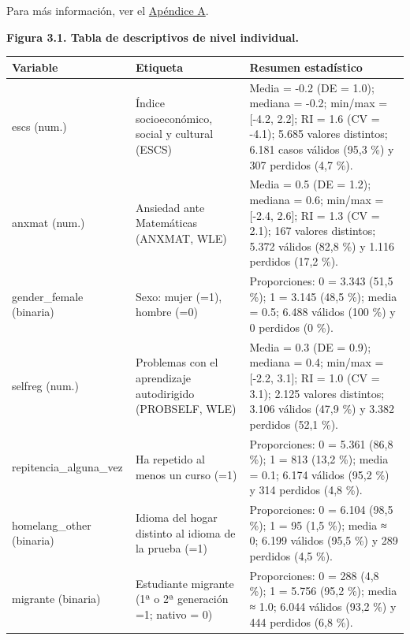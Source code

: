 \documentclass[
  spanish,
  a4paper,
  oneside]{scrbook}
\begin{document}
Para más información, ver el \hyperref[sec-anexo-a]{Apéndice A}.

\begingroup
\footnotesize

\textbf{Figura 3.1. Tabla de descriptivos de nivel individual.}

\begin{longtable}[]{@{}
  >{\raggedright\arraybackslash}p{}
  >{\raggedright\arraybackslash}p{}
  >{\raggedright\arraybackslash}p{}@{}}
\toprule\noalign{}
\begin{minipage}[b]{\linewidth}\raggedright
Variable
\end{minipage} & \begin{minipage}[b]{\linewidth}\raggedright
Etiqueta
\end{minipage} & \begin{minipage}[b]{\linewidth}\raggedright
Resumen estadístico
\end{minipage} \\
\midrule\noalign{}
\endhead
\bottomrule\noalign{}
\endlastfoot
escs (num.) & Índice socioeconómico, social y cultural (ESCS) & Media =
-0.2 (DE = 1.0); mediana = -0.2; min/max = {[}-4.2, 2.2{]}; RI = 1.6 (CV
= -4.1); 5.685 valores distintos; 6.181 casos válidos (95,3 \%) y 307
perdidos (4,7 \%). \\
anxmat (num.) & Ansiedad ante Matemáticas (ANXMAT, WLE) & Media = 0.5
(DE = 1.2); mediana = 0.6; min/max = {[}-2.4, 2.6{]}; RI = 1.3 (CV =
2.1); 167 valores distintos; 5.372 válidos (82,8 \%) y 1.116 perdidos
(17,2 \%). \\
gender\_female (binaria) & Sexo: mujer (=1), hombre (=0) & Proporciones:
0 = 3.343 (51,5 \%); 1 = 3.145 (48,5 \%); media = 0.5; 6.488 válidos
(100 \%) y 0 perdidos (0 \%). \\
selfreg (num.) & Problemas con el aprendizaje autodirigido (PROBSELF,
WLE) & Media = 0.3 (DE = 0.9); mediana = 0.4; min/max = {[}-2.2, 3.1{]};
RI = 1.0 (CV = 3.1); 2.125 valores distintos; 3.106 válidos (47,9 \%) y
3.382 perdidos (52,1 \%). \\
repitencia\_alguna\_vez & Ha repetido al menos un curso (=1) &
Proporciones: 0 = 5.361 (86,8 \%); 1 = 813 (13,2 \%); media = 0.1; 6.174
válidos (95,2 \%) y 314 perdidos (4,8 \%). \\
homelang\_other (binaria) & Idioma del hogar distinto al idioma de la
prueba (=1) & Proporciones: 0 = 6.104 (98,5 \%); 1 = 95 (1,5 \%); media
≈ 0; 6.199 válidos (95,5 \%) y 289 perdidos (4,5 \%). \\
migrante (binaria) & Estudiante migrante (1ª o 2ª generación =1; nativo
= 0) & Proporciones: 0 = 288 (4,8 \%); 1 = 5.756 (95,2 \%); media ≈ 1.0;
6.044 válidos (93,2 \%) y 444 perdidos (6,8 \%). \\
\end{longtable}
\end{document}
